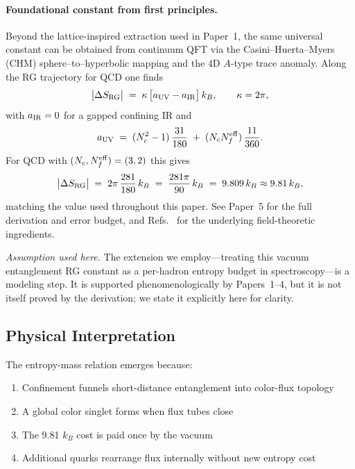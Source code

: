 \documentclass[12pt,a4paper]{article}
\begin{document}
\paragraph{Foundational constant from first principles.}
Beyond the lattice-inspired extraction used in Paper~1, the same universal constant can be obtained from continuum QFT via the Casini--Huerta--Myers (CHM) sphere--to--hyperbolic mapping and the 4D $A$-type trace anomaly. Along the RG trajectory for QCD one finds
\begin{equation}
\big|\Delta S_{\rm RG}\big| \;=\; \kappa\,\big[a_{\rm UV}-a_{\rm IR}\big]\,k_B,\qquad \kappa=2\pi,
\end{equation}
with $a_{\rm IR}=0$ for a gapped confining IR and
\begin{equation}
a_{\rm UV} \;=\; (N_c^2-1)\,\frac{31}{180} \;+\; (N_c N_f^{\rm eff})\,\frac{11}{360}.
\end{equation}
For QCD with $(N_c,N_f^{\rm eff})=(3,2)$ this gives
\begin{equation}
\big|\Delta S_{\rm RG}\big| \;=\; 2\pi\,\frac{281}{180}\,k_B \;=\; \frac{281\pi}{90}\,k_B \;=\; 9.809\,k_B \approx 9.81\,k_B,
\end{equation}
matching the value used throughout this paper. See Paper~5 for the full derivation and error budget, and Refs.~\cite{CHM,KS,Anselmi1998,TupayP5} for the underlying field-theoretic ingredients.

\emph{Assumption used here.} The extension we employ---treating this vacuum entanglement RG constant as a per-hadron entropy budget in spectroscopy---is a modeling step. It is supported phenomenologically by Papers~1--4, but it is not itself proved by the derivation; we state it explicitly here for clarity.

\subsection{Physical Interpretation}

The entropy-mass relation emerges because:

\begin{enumerate}
\item Confinement funnels short-distance entanglement into color-flux topology
\item A global color singlet forms when flux tubes close
\item The 9.81 $k_B$ cost is paid once by the vacuum
\item Additional quarks rearrange flux internally without new entropy cost
\end{enumerate}
\end{document}
